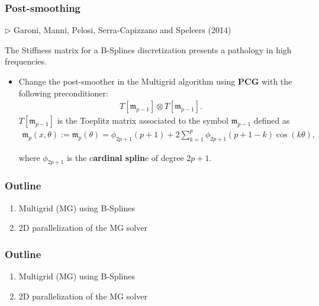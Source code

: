 \begin{frame}
\frametitle{Post-smoothing}
\begin{flushright}
$\triangleright$  {\scriptsize Garoni, Manni, Pelosi, Serra-Capizzano and  Speleers (2014)}
\end{flushright}
  \small
The Stiffness matrix for a B-Splines discretization presents a pathology in high frequencies. 
 \begin{itemize}
\item[\ding{224}] Change the post-smoother in the Multigrid algorithm using \textbf{PCG} with the following preconditioner:
\begin{align*}
 T[\mathfrak{m}_{p-1}] \otimes T[\mathfrak{m}_{p-1}].
  \end{align*}
$T[\mathfrak{m}_{p-1}]$ is the Toeplitz matrix associated to the symbol $\mathfrak{m}_{p-1}$ defined as
\begin{align*}
    \mathfrak{m}_p(x, \theta) := \mathfrak{m}_p(\theta) = \phi_{2p+1}(p+1) + 2 \sum_{k=1}^p \phi_{2p+1}(p+1-k) \cos(k \theta),
 \end{align*}

where $\phi_{2p+1}$ is the c\textbf{ardinal splin}e of degree $2p+1$.
\end{itemize}

\end{frame}

\begin{frame}
\frametitle{Outline}

\begin{enumerate}[I]
  \item <0> Multigrid (MG) using B-Splines 
  \item <1> 2D parallelization of the MG solver
\end{enumerate}
%
\end{frame}

\begin{frame}
\frametitle{Outline}

\begin{enumerate}[I]
  \item <0> Multigrid (MG) using B-Splines 
  \item <1> 2D parallelization of the MG solver
\end{enumerate}
%
\end{frame}

